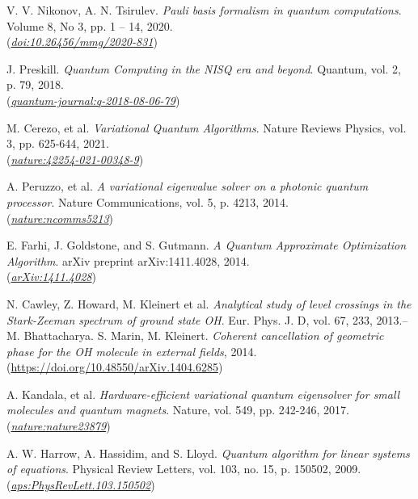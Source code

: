 \documentclass[a4paper]{report}
\begin{document}
\begin{thebibliography}{99}
    V. V. Nikonov, A. N. Tsirulev. \textit{Pauli basis formalism in quantum computations}. Volume 8, No 3, pp. 1 – 14, 2020.\\
    (\href{https:doi.org/10.26456/mmg/2020-831} {\textit{doi:10.26456/mmg/2020-831}})

    J. Preskill. \textit{Quantum Computing in the NISQ era and beyond}. Quantum, vol. 2, p. 79, 2018.\\
    (\href{https://quantum-journal.org/papers/q-2018-08-06-79/}{\textit{quantum-journal:q-2018-08-06-79}})

    M. Cerezo, et al. \textit{Variational Quantum Algorithms}. Nature Reviews Physics, vol. 3, pp. 625-644, 2021.\\
    (\href{https://www.nature.com/articles/s42254-021-00348-9}{\textit{nature:42254-021-00348-9}})

    A. Peruzzo, et al. \textit{A variational eigenvalue solver on a photonic quantum processor}. Nature Communications, vol. 5, p. 4213, 2014.\\
    (\href{https://www.nature.com/articles/ncomms5213}{\textit{nature:ncomms5213}})

    E. Farhi, J. Goldstone, and S. Gutmann. \textit{A Quantum Approximate Optimization Algorithm}. arXiv preprint arXiv:1411.4028, 2014.\\
    (\href{https://arxiv.org/abs/1411.4028}{\textit{arXiv:1411.4028}})

    \label{Cawley2013}
    N. Cawley, Z. Howard, M. Kleinert et al. \textit{Analytical study of level crossings in the Stark-Zeeman spectrum of ground state OH}. Eur. Phys. J. D, vol. 67, 233, 2013.\;--\; M. Bhattacharya. S. Marin, M. Kleinert. \textit{Coherent cancellation of geometric phase for the OH molecule in external fields}, 2014.
    (\url{https://doi.org/10.48550/arXiv.1404.6285})

    A. Kandala, et al. \textit{Hardware-efficient variational quantum eigensolver for small molecules and quantum magnets}. Nature, vol. 549, pp. 242-246, 2017.\;    (\href{https://www.nature.com/articles/nature23879}{\textit{nature:nature23879}})

    A. W. Harrow, A. Hassidim, and S. Lloyd. \textit{Quantum algorithm for linear systems of equations}. Physical Review Letters, vol. 103, no. 15, p. 150502, 2009.\\
    (\href{https://journals.aps.org/prl/abstract/10.1103/PhysRevLett.103.150502}{\textit{aps:PhysRevLett.103.150502}})


\end{thebibliography}
\end{document}
